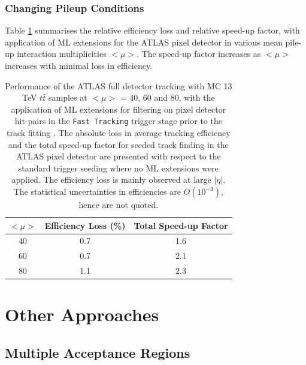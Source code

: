 \subsubsection{Changing Pileup Conditions}
Table \ref{tab:pileup} summarises the relative efficiency loss and relative speed-up factor, with application of ML extensions for the ATLAS pixel detector in various mean pile-up interaction multiplicities $<\mu>$. The speed-up factor increases as $<\mu>$ increases with minimal loss in efficiency.

\begin{table}[htb!]
\caption{Performance of the ATLAS full detector tracking with MC 13 TeV $t\bar{t}$ samples at $<\mu>$ = 40, 60 and 80, with the application of ML extensions for filtering on pixel detector hit-pairs in the \texttt{Fast Tracking} trigger stage prior to the track fitting \cite{public-hlt}. The absolute loss in average tracking efficiency and the total speed-up factor for seeded track finding in the ATLAS pixel detector are presented with respect to the standard trigger seeding where no ML extensions were applied. The efficiency loss is mainly observed at large $|\eta|$. The statistical uncertainties in efficiencies are $O(10^{-3})$, hence are not quoted.}
\begin{center}
\begin{tabular}{ccc}
\toprule
$<\mu>$ & Efficiency Loss (\%) & Total Speed-up Factor  \\
\hline
40 & 0.7 & 1.6 \\
60 & 0.7 & 2.1 \\
80 & 1.1 & 2.3 \\
\bottomrule
\end{tabular}
\end{center}
\label{tab:pileup}
\end{table}


\section{Other Approaches}
\subsection{Multiple Acceptance Regions}

